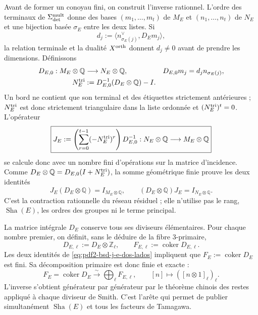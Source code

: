 Avant de former un conoyau fini, on construit l'inverse rationnel. L'ordre
des terminaux de $\Sigma_{\rm det}^{\rm mult}$ donne des bases
$(m_1,\ldots,m_t)$ de $M_E$ et $(n_1,\ldots,n_t)$ de $N_E$ et une bijection
basée $\sigma_E$ entre les deux listes. Si
\[
 d_j:=\bigl\langle n_{\sigma_E(j)}^\vee,D_Em_j\bigr\rangle,
\]
la relation terminale et la dualité $X^{\rm orth}$ donnent $d_j\ne0$ avant de
prendre les dimensions. Définissons
\begin{equation}\label{eq:pdf2-bsd-d0-nilpotente}
 \begin{aligned}
  D_{E,0}:M_E\otimes\mathbb Q&\longrightarrow N_E\otimes\mathbb Q,
  &D_{E,0}m_j&=d_jn_{\sigma_E(j)},\\
  N_E^{\rm tri}&:=D_{E,0}^{-1}(D_E\otimes\mathbb Q)-I.
 \end{aligned}
\end{equation}
Un bord ne contient que son terminal et des étiquettes strictement antérieures ;
$N_E^{\rm tri}$ est donc strictement triangulaire dans la liste ordonnée et
$(N_E^{\rm tri})^t=0$. L'opérateur
\begin{equation}\label{eq:pdf2-bsd-j-e-inverso-racional}
 \boxed{
 J_E:=\left(\sum_{r=0}^{t-1}(-N_E^{\rm tri})^r\right)D_{E,0}^{-1}:
 N_E\otimes\mathbb Q\longrightarrow M_E\otimes\mathbb Q }
\end{equation}
se calcule donc avec un nombre fini d'opérations sur la matrice
d'incidence. Comme
$D_E\otimes\mathbb Q=D_{E,0}(I+N_E^{\rm tri})$, la somme géométrique finie
prouve les deux identités
\begin{equation}\label{eq:pdf2-bsd-j-e-dos-lados}
 J_E(D_E\otimes\mathbb Q)=I_{M_E\otimes\mathbb Q},
 \qquad
 (D_E\otimes\mathbb Q)J_E=I_{N_E\otimes\mathbb Q}.
\end{equation}
C'est la contraction rationnelle du réseau résiduel ; elle n'utilise pas le rang,
$\operatorname{Sha}(E)$, les ordres des groupes ni le terme principal.

La matrice intégrale $D_E$ conserve tous ses diviseurs élémentaires. Pour chaque
nombre premier, on définit, sans le déduire de la fibre $3$-primaire,
\begin{equation}\label{eq:pdf2-bsd-f-ell-def}
 D_{E,\ell}:=D_E\otimes\mathbb Z_\ell,
 \qquad
 F_{E,\ell}:=\operatorname{coker}D_{E,\ell}.
\end{equation}
Les deux identités de \eqref{eq:pdf2-bsd-j-e-dos-lados} impliquent que
$F_E:=\operatorname{coker}D_E$ est fini. Sa
décomposition primaire est donc finie et exacte :
\begin{equation}\label{eq:pdf2-bsd-f-descomposicion-primaria}
 F_E=\operatorname{coker}D_E
 \xrightarrow{\ \sim\ }
 \bigoplus_{\ell}F_{E,\ell},
 \qquad
 [n]\longmapsto([n\otimes1]_\ell)_\ell.
\end{equation}
L'inverse s'obtient générateur par générateur par le théorème chinois des restes
appliqué à chaque diviseur de Smith. C'est l'arête qui permet de publier
simultanément $\operatorname{Sha}(E)$ et tous les facteurs de Tamagawa.

